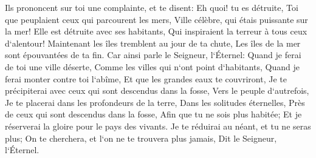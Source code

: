 \verse Ils prononcent sur toi une complainte, et te disent: Eh quoi! tu es détruite, Toi que peuplaient ceux qui parcourent les mers, Ville célèbre, qui étais puissante sur la mer! Elle est détruite avec ses habitants, Qui inspiraient la terreur à tous ceux d`alentour! 
\verse Maintenant les îles tremblent au jour de ta chute, Les îles de la mer sont épouvantées de ta fin. 
\verse Car ainsi parle le Seigneur, l`Éternel: Quand je ferai de toi une ville déserte, Comme les villes qui n`ont point d`habitants, Quand je ferai monter contre toi l`abîme, Et que les grandes eaux te couvriront, 
\verse Je te précipiterai avec ceux qui sont descendus dans la fosse, Vers le peuple d`autrefois, Je te placerai dans les profondeurs de la terre, Dans les solitudes éternelles, Près de ceux qui sont descendus dans la fosse, Afin que tu ne sois plus habitée; Et je réserverai la gloire pour le pays des vivants. 
\verse Je te réduirai au néant, et tu ne seras plus; On te cherchera, et l`on ne te trouvera plus jamais, Dit le Seigneur, l`Éternel. 

\chapter{}

